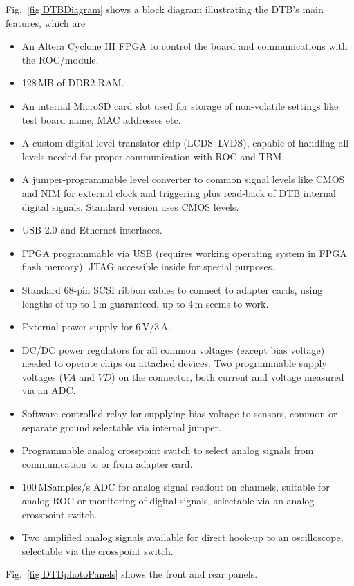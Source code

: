 Fig.~\ref{fig:DTBDiagram} shows a block diagram illustrating the DTB's main features, which are
\begin{itemize}
    \item An Altera Cyclone III FPGA to control the board and communications with the \gls{ROC}/module.
    \item 128\,MB of DDR2 RAM.
    \item An internal MicroSD card slot used for storage of non-volatile settings like test board name, MAC addresses etc. 
    \item A custom digital level translator chip (LCDS--LVDS), capable of handling all levels needed for proper communication with ROC and TBM.
    \item A jumper-programmable level converter to common signal levels like CMOS and NIM for external clock and triggering plus read-back of DTB internal digital signals. Standard version uses CMOS levels.
    \item USB 2.0 and Ethernet interfaces.
    \item FPGA programmable via USB (requires working operating system in FPGA flash memory). JTAG accessible inside for special purposes.
    \item Standard 68-pin SCSI ribbon cables to connect to adapter cards, using lengths of up to 1\,m guaranteed, up to 4\,m seems to work.
    \item External power supply for 6\,V/3\,A.
    \item DC/DC power regulators for all common voltages (except bias voltage) needed to operate chips on attached devices. Two programmable supply voltages ($VA$ and $VD$) on the connector, both current and voltage measured via an ADC.
    \item Software controlled relay for supplying bias voltage to sensors, common or separate ground selectable via internal jumper.
    \item Programmable analog crosspoint switch to select analog signals from communication to or from adapter card.
    \item 100\,MSamples/s ADC for analog signal readout on channels, suitable for analog \gls{ROC} or monitoring of digital signals, selectable via an analog crosspoint switch.
    \item Two amplified analog signals available for direct hook-up to an oscilloscope, selectable via the crosspoint switch.
\end{itemize}
Fig.~\ref{fig:DTBphotoPanels} shows the front and rear panels.

